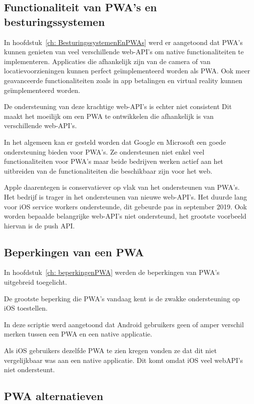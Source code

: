 	\subsection{Functionaliteit van PWA's en besturingssystemen}
	
		In hoofdstuk~\ref{ch: BesturingssystemenEnPWAs} werd er aangetoond dat PWA's kunnen genieten van veel verschillende web-API's om native functionaliteiten te implementeren. Applicaties die afhankelijk zijn van de camera of van locatievoorzieningen kunnen perfect geïmplementeerd worden als PWA. Ook meer geavanceerde functionaliteiten zoals in app betalingen en virtual reality kunnen geïmplementeerd worden.
		
		De ondersteuning van deze krachtige web-API's is echter niet consistent Dit maakt het moeilijk om een PWA te ontwikkelen die afhankelijk is van verschillende web-API's. 
		
		In het algemeen kan er gesteld worden dat Google en Microsoft een goede ondersteuning bieden voor PWA's. Ze ondersteunen niet enkel veel functionaliteiten voor PWA's maar beide bedrijven werken actief aan het uitbreiden van de functionaliteiten die beschikbaar zijn voor het web. 
		
		Apple daarentegen is conservatiever op vlak van het ondersteunen van PWA's. Het bedrijf is trager in het ondersteunen van nieuwe web-API's. 
		Het duurde lang voor iOS service workers ondersteunde, dit gebeurde pas in september 2019. Ook worden bepaalde belangrijke web-API's niet ondersteund, het grootste voorbeeld hiervan is de push API.
					
	\subsection{Beperkingen van een PWA}
		In hoofdstuk~\ref{ch: beperkingenPWA} werden de beperkingen van PWA's uitgebreid toegelicht. 
	
		De grootste beperking die PWA's vandaag kent is de zwakke ondersteuning op iOS toestellen.
		
		In deze scriptie werd aangetoond dat Android gebruikers geen of amper verschil merken tussen een PWA en een native applicatie.  
		
		Als iOS gebruikers dezelfde PWA te zien kregen vonden ze dat dit niet vergelijkbaar was aan een native applicatie. Dit komt omdat iOS veel webAPI's niet ondersteunt.
		
	 
	
	\subsection{PWA alternatieven}
		
